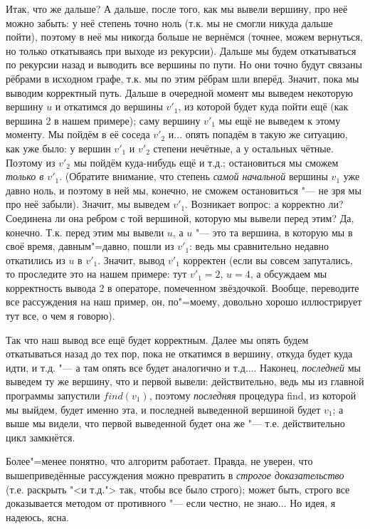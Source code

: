 Итак, что же дальше? А дальше, после того, как мы вывели вершину, про неё можно забыть: у неё 
степень точно ноль (т.к. мы не смогли никуда дальше пойти), поэтому в неё мы никогда больше не 
вернёмся (точнее, можем вернуться, но только откатываясь при выходе из рекурсии). Дальше мы будем 
откатываться по рекурсии назад и выводить все вершины по пути. Но они 
точно будут связаны рёбрами в исходном графе, т.к. мы по этим рёбрам шли вперёд. Значит, пока мы 
выводим корректный путь. Дальше в очередной момент мы выведем некоторую вершину $u$ и откатимся до 
вершины $v'_1$, из которой будет куда пойти ещё (как вершина 2 в нашем примере); саму вершину 
$v'_1$ мы ещё не выведем к этому моменту. Мы пойдём в её соседа $v'_2$ и... опять попадём в такую 
же ситуацию, как уже было: у вершин $v'_1$ и $v'_2$ степени нечётные, а у остальных чётные. Поэтому 
из $v'_2$ мы пойдём куда-нибудь ещё и т.д.; остановиться мы сможем \textit{только в $v'_1$}. 
(Обратите внимание, что степень \textit{самой начальной} вершины $v_1$ уже давно ноль, и поэтому в 
ней мы, конечно, не сможем остановиться "--- не зря мы про неё забыли). Значит, мы выведем $v'_1$. 
Возникает вопрос: а корректно ли? Соединена ли она ребром с той вершиной, которую мы вывели перед 
этим? Да, конечно. Т.к. перед этим мы вывели $u$, а $u$ "--- это та вершина, в которую мы в своё 
время, давным"=давно, пошли из $v'_1$: ведь мы сравнительно недавно откатились из $u$ в $v'_1$. 
Значит, вывод $v'_1$ корректен (если вы совсем запутались, то проследите это на нашем примере: тут 
$v'_1=2$, $u=4$, а обсуждаем мы корректность вывода 2 в операторе, помеченном звёздочкой. Вообще, 
переводите все рассуждения на наш пример, он, по"=моему, довольно хорошо иллюстрирует тут все, о 
чем я говорю). 

Так что наш вывод все ещё будет корректным. Далее мы опять будем откатываться назад до тех пор, 
пока не откатимся в вершину, откуда будет куда идти, и т.д. "--- а там опять все будет аналогично и т.д....
Наконец, \textit{последней} мы выведем ту же вершину, что и первой вывели: действительно, ведь мы 
из главной программы запустили $find(v_1)$, поэтому \textit{последняя} процедура find, из которой 
мы выйдем, будет именно эта, и последней выведенной вершиной будет $v_1$; а выше мы видели, что 
первой выведенной будет она же "--- т.е. действительно цикл замкнётся. 

Более"=менее понятно, что алгоритм работает. Правда, не уверен, что вышеприведённые рассуждения 
можно превратить в \textit{строгое доказательство} (т.е. раскрыть "<и т.д."> так, чтобы все было 
строго); может быть, строго все доказывается методом от противного "--- если честно, не знаю... Но 
идея, я надеюсь, ясна.

